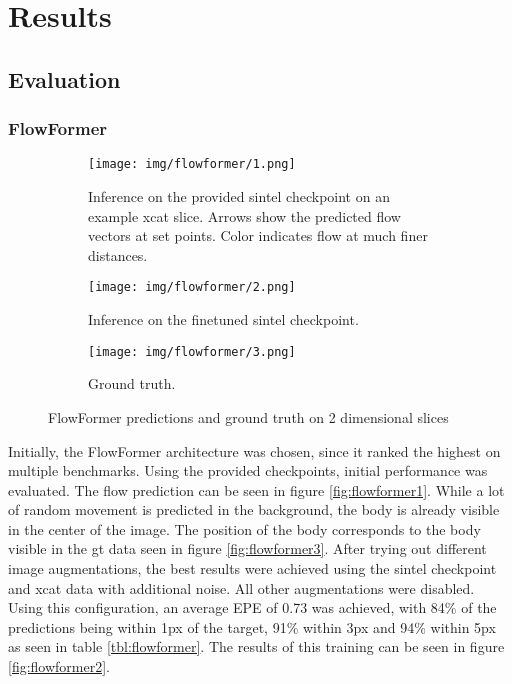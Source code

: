 \chapter{Results}
\section{Evaluation}
\subsection{FlowFormer}
\begin{figure}
	\centering
	\begin{subfigure}{\textwidth}
		
		\texttt{[image: img/flowformer/1.png]}
		\caption{Inference on the provided sintel checkpoint on an example xcat slice. Arrows show the predicted flow vectors at set points. Color indicates flow at much finer distances.}
		\label{fig:flowformer1}
		
	\end{subfigure}
	\begin{subfigure}{\textwidth}
		
		\texttt{[image: img/flowformer/2.png]}
		\caption{Inference on the finetuned sintel checkpoint.}
		\label{fig:flowformer2}
	\end{subfigure}
	\begin{subfigure}{\textwidth}
		
		\texttt{[image: img/flowformer/3.png]}
		\caption{Ground truth.}
		\label{fig:flowformer3}
	\end{subfigure}
	\caption{FlowFormer predictions and ground truth on 2 dimensional slices}
\end{figure}

Initially, the FlowFormer architecture was chosen, since it ranked the highest on multiple benchmarks.
Using the provided checkpoints, initial performance was evaluated. The flow prediction can be seen in figure \eqref{fig:flowformer1}. While a lot of random movement is predicted in the background, the body is already visible in the center of the  image. The position of the body corresponds to the body visible in the \ac{gt} data seen in figure \eqref{fig:flowformer3}. After trying out different image augmentations, the best results were achieved using the sintel checkpoint  and xcat data with additional noise. All other augmentations were disabled. Using this configuration, an average \ac{EPE} of 0.73 was achieved, with 84\% of the predictions being within 1px of the target, 91\% within 3px and 94\% within 5px as seen in table \eqref{tbl:flowformer}. The results of this training can be seen in figure \eqref{fig:flowformer2}.

